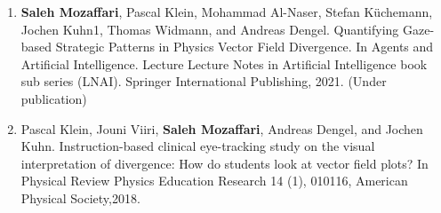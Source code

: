 \vspace{0.1cm}

\vspace{0.2cm}
\begin{enumerate}
	\item \textbf{Saleh Mozaffari}, Pascal Klein, Mohammad Al-Naser, Stefan Küchemann,
	Jochen Kuhn1, Thomas Widmann, and Andreas Dengel.  Quantifying Gaze-based Strategic Patterns in Physics Vector Field Divergence. In Agents and Artificial Intelligence. Lecture Lecture Notes in Artificial Intelligence book sub series (LNAI). Springer International Publishing, 2021. (Under publication)
	\item Pascal Klein, Jouni Viiri, \textbf{Saleh Mozaffari}, Andreas Dengel, and Jochen Kuhn. Instruction-based clinical eye-tracking study on the visual interpretation of divergence: How do students look at vector field plots? In Physical Review Physics Education Research 14 (1), 010116, American Physical Society,2018.


\end{enumerate}
